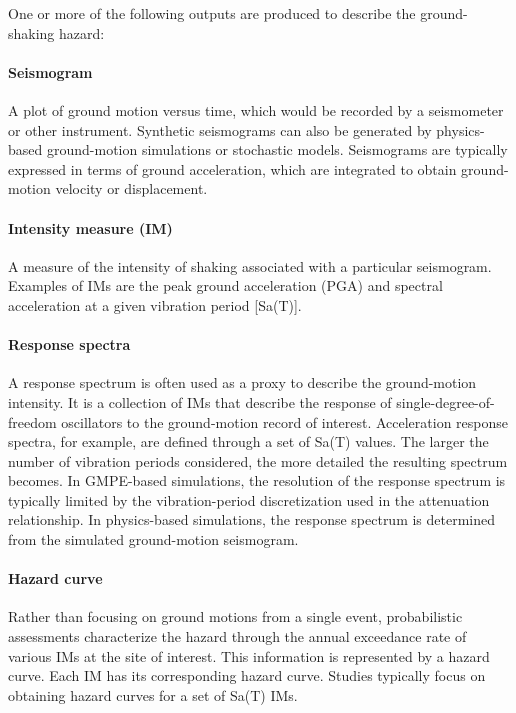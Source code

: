 \noindent One or more of the following outputs are produced to describe the ground-shaking hazard:

\paragraph{Seismogram } A plot of ground motion versus time, which would be recorded by a seismometer or other instrument. Synthetic seismograms can also be generated by physics-based ground-motion simulations or stochastic models. Seismograms are typically expressed in terms of ground acceleration, which are integrated to obtain ground-motion velocity or displacement. 

\paragraph{Intensity measure (IM)} A measure of the intensity of shaking associated with a particular seismogram. Examples of IMs are the peak ground acceleration (PGA) and spectral acceleration at a given vibration period [Sa(T)].

\paragraph{Response spectra} A response spectrum is often used as a proxy to describe the ground-motion intensity. It is a collection of IMs that describe the response of single-degree-of-freedom oscillators to the ground-motion record of interest. Acceleration response spectra, for example, are defined through a set of Sa(T) values. The larger the number of vibration periods considered, the more detailed the resulting spectrum becomes. In GMPE-based simulations, the resolution of the response spectrum is typically limited by the vibration-period discretization used in the attenuation relationship. In physics-based simulations, the response spectrum is determined from the simulated ground-motion seismogram.

\paragraph{Hazard curve } Rather than focusing on ground motions from a single event, probabilistic assessments characterize the hazard through the annual exceedance rate of various IMs at the site of interest. This information is represented by a hazard curve. Each IM has its corresponding hazard curve. Studies typically focus on obtaining hazard curves for a set of Sa(T) IMs. 

